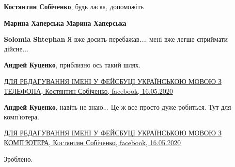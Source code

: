 \begin{itemize}
\begin{itemize}
\textbf{Костянтин Собіченко}, будь ласка, допоможіть

 
\textbf{Марина Хаперська} \textbf{Марина Хаперська} 👨🔧

 
\textbf{Solomia Shtephan} Я вже досить перебажав.... мені вже легше сприймати дійсне...

 
\textbf{Андрей Куценко}, приблизно ось такий шлях.

\href{https://www.facebook.com/groups/326328151119372/permalink/1006650706420443/}{%
ДЛЯ РЕДАГУВАННЯ ІМЕНІ У ФЕЙСБУЦІ УКРАЇНСЬКОЮ МОВОЮ З ТЕЛЕФОНА, Костянтин Собіченко, %
facebook, 16.05.2020%
}

 
\textbf{Андрей Куценко}, навіть не знаю... Це ж все просто дуже робиться.
Тут для комп'ютера.

\href{https://www.facebook.com/groups/326328151119372/permalink/1006654986420015/}{%
ДЛЯ РЕДАГУВАННЯ ІМЕНІ У ФЕЙСБУЦІ УКРАЇНСЬКОЮ МОВОЮ З КОМП'ЮТЕРА, Костянтин Собіченко, %
facebook, 16.05.2020%
%
}

 
Зроблено.

 

\end{itemize}
\end{itemize}
